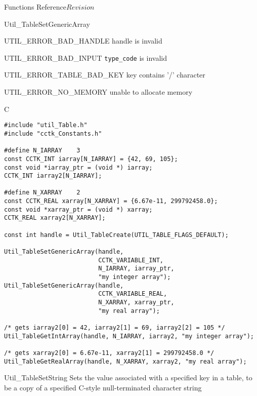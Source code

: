 \begin{cactuspart}{ Functions Reference}{}{$Revision$}
\begin{FunctionDescription}{Util\_TableSetGenericArray}
\begin{ErrorSection}
\begin{Error}{UTIL\_ERROR\_BAD\_HANDLE}
handle is invalid
\end{Error}
\begin{Error}{UTIL\_ERROR\_BAD\_INPUT}
\verb|type_code| is invalid
\end{Error}
\begin{Error}{UTIL\_ERROR\_TABLE\_BAD\_KEY}
key contains '/' character
\end{Error}
\begin{Error}{UTIL\_ERROR\_NO\_MEMORY}
unable to allocate memory
\end{Error}
\end{ErrorSection}

\begin{ExampleSection}
\begin{Example}{C}
\begin{verbatim}
#include "util_Table.h"
#include "cctk_Constants.h"

#define N_IARRAY    3
const CCTK_INT iarray[N_IARRAY] = {42, 69, 105};
const void *iarray_ptr = (void *) iarray;
CCTK_INT iarray2[N_IARRAY];

#define N_XARRAY    2
const CCTK_REAL xarray[N_XARRAY] = {6.67e-11, 299792458.0};
const void *xarray_ptr = (void *) xarray;
CCTK_REAL xarray2[N_XARRAY];

const int handle = Util_TableCreate(UTIL_TABLE_FLAGS_DEFAULT);

Util_TableSetGenericArray(handle,
                          CCTK_VARIABLE_INT,
                          N_IARRAY, iarray_ptr,
                          "my integer array");
Util_TableSetGenericArray(handle,
                          CCTK_VARIABLE_REAL,
                          N_XARRAY, xarray_ptr,
                          "my real array");

/* gets iarray2[0] = 42, iarray2[1] = 69, iarray2[2] = 105 */
Util_TableGetIntArray(handle, N_IARRAY, iarray2, "my integer array");

/* gets xarray2[0] = 6.67e-11, xarray2[1] = 299792458.0 */
Util_TableGetRealArray(handle, N_XARRAY, xarray2, "my real array");
\end{verbatim}
\end{Example}
\end{ExampleSection}
\end{FunctionDescription}


\begin{FunctionDescription}{Util\_TableSetString}
\label{Util-TableSetString}
Sets the value associated with a specified key in a table, to be
a copy of a specified C-style null-terminated character string


\end{FunctionDescription}
\end{cactuspart}

